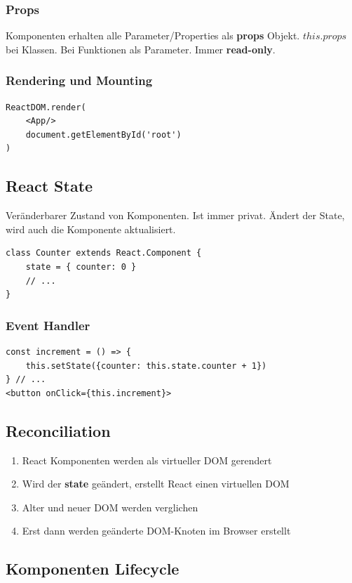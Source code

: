 \subsubsection{Props}
Komponenten erhalten alle Parameter/Properties als \textbf{props} Objekt.
$this.props$ bei Klassen.
Bei Funktionen als Parameter.
Immer \textbf{read-only}.

\subsubsection{Rendering und Mounting}
\begin{lstlisting}
ReactDOM.render(
    <App/>
    document.getElementById('root')
)
\end{lstlisting}

\subsection{React State}
Veränderbarer Zustand von Komponenten.
Ist immer privat.
Ändert der State, wird auch die Komponente aktualisiert.
\begin{lstlisting}
class Counter extends React.Component {
    state = { counter: 0 }
    // ...
}
\end{lstlisting}

\subsubsection{Event Handler}
\begin{lstlisting}
const increment = () => {
    this.setState({counter: this.state.counter + 1})
} // ...
<button onClick={this.increment}>
\end{lstlisting}

\subsection{Reconciliation}
\begin{enumerate}
    \item React Komponenten werden als virtueller DOM gerendert
    \item Wird der \textbf{state} geändert, erstellt React einen virtuellen DOM
    \item Alter und neuer DOM werden verglichen
    \item Erst dann werden geänderte DOM-Knoten im Browser erstellt
\end{enumerate}

\subsection{Komponenten Lifecycle}
